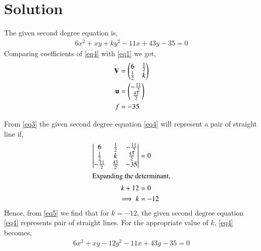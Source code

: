 \documentclass[journal,12pt,twocolumn]{IEEEtran}
\begin{document}
\section{Solution}

The given second degree equation is,
\begin{align}
6x^2 +xy+ky^2-11x+43y-35 = 0 \label{eq4}
\end{align}
Comparing coefficients of \eqref{eq4} with \eqref{eq1} we get,
\begin{align}
\mathbf{V} &= \begin{pmatrix}6&\frac{1}{2}\\\frac{1}{2}&k\end{pmatrix}\\
\mathbf{u} &= \begin{pmatrix}-\frac{11}{2}\\\frac{43}{2}\end{pmatrix}\\
f &= -35
\end{align}

From \eqref{eq3} the given second degree equation \eqref{eq4} will represent a pair of straight line if, 
\begin{align}
\begin{vmatrix}6&\frac{1}{2}&-\frac{11}{2}\\ \frac{1}{2}&k&\frac{43}{2}\\-\frac{11}{2}& \frac{43}{2}&-35\end{vmatrix}&=0\\
\intertext{Expanding the determinant,}
k+12&=0\\
\implies k&=-12\label{eq5}
\end{align}
Hence, from \eqref{eq5} we find that for $k=-12$, the given second degree equation \eqref{eq4} represents pair of straight lines. For the appropriate value of $k$, \eqref{eq4} becomes,
\begin{align}
6x^2 +xy-12y^2-11x+43y-35 = 0\label{eqmain}
\end{align}
\end{document}
